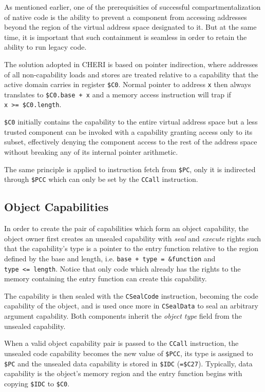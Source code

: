 \documentclass[a4paper,12pt,twoside,openright]{report}
\newcommand{\reg}[1]{\texttt{\$#1}}
\newcommand{\insn}[1]{\texttt{#1}}
\begin{document}
As mentioned earlier, one of the prerequisities of successful compartmentalization of native code is the ability to prevent a component from accessing addresses beyond the region of the virtual address space designated to it. But at the same time, it is important that such containment is seamless in order to retain the ability to run legacy code.

The solution adopted in CHERI is based on pointer indirection, where addresses of all non-capability loads and stores are treated relative to a capability that the active domain carries in register \reg{C0}. Normal pointer to address \texttt{x} then always translates to \texttt{\reg{C0}.base~+~x} and a memory access instruction will trap if \texttt{x~>=~\reg{C0}.length}. 

\reg{C0} initially contains the capability to the entire virtual address space but a less trusted component can be invoked with a capability granting access only to its subset, effectively denying the component access to the rest of the address space without breaking any of its internal pointer arithmetic.

The same principle is applied to instruction fetch from \reg{PC}, only it is indirected through \reg{PCC} which can only be set by the \insn{CCall} instruction.

\subsection{Object Capabilities}

In order to create the pair of capabilities which form an object capability, the object owner first creates an unsealed capability with \emph{seal} and \emph{execute} rights such that the capability's type is a pointer to the entry function relative to the region defined by the base and length, i.e. \texttt{base~+~type~=~\&function} and \texttt{type~<=~length}. Notice that only code which already has the rights to the memory containing the entry function can create this capability. 

The capability is then sealed with the \insn{CSealCode} instruction, becoming the code capability of the object, and is used once more in \insn{CSealData} to seal an arbitrary argument capability. Both components inherit the \emph{object type} field from the unsealed capability.

When a valid object capability pair is passed to the \insn{CCall} instruction, the unsealed code capability becomes the new value of \reg{PCC}, its type is assigned to \reg{PC} and the unsealed data capability is stored in \reg{IDC} (\texttt{=\reg{C27}}). Typically, data capability is the object's memory region and the entry function begins with copying \reg{IDC} to \reg{C0}.
\end{document}
